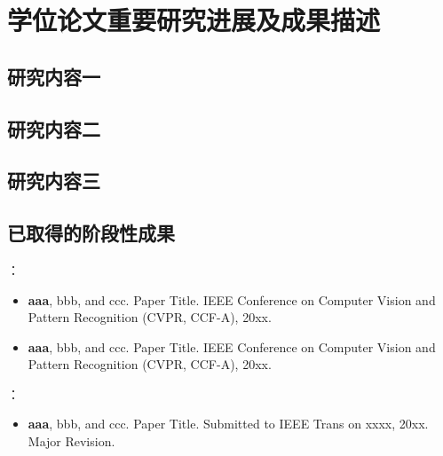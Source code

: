 \chapter{学位论文重要研究进展及成果描述}
\section{研究内容一}
\section{研究内容二}
\section{研究内容三}

\newpage
\section{已取得的阶段性成果}
：
\begin{itemize}
	\item \textbf{aaa}, bbb, and ccc. Paper Title. IEEE Conference on Computer Vision and Pattern Recognition (CVPR, CCF-A), 20xx.
	\item \textbf{aaa}, bbb, and ccc. Paper Title. IEEE Conference on Computer Vision and Pattern Recognition (CVPR, CCF-A), 20xx.
\end{itemize}

：
\begin{itemize}
	\item \textbf{aaa}, bbb, and ccc. Paper Title. Submitted to IEEE Trans on xxxx, 20xx. Major Revision.
\end{itemize}
